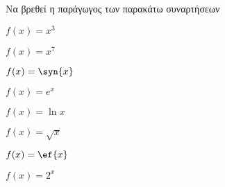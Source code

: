 Να βρεθεί η παράγωγος των παρακάτω συναρτήσεων
\begin{multicols}{2}
\begin{alist}
\item $ f(x)=x^3 $
\item $ f(x)=x^7 $
\item $ f(x)=\syn{x} $
\item $ f(x)=e^x $
\item $ f(x)=\ln{x} $
\item $ f(x)=\sqrt{x} $
\item $ f(x)=\ef{x} $
\item $ f(x)=2^x $
\end{alist}
\end{multicols}
